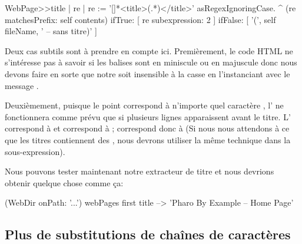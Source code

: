 \documentclass[a4paper,10pt,twoside]{book}
\begin{document}

\begin{code}{}
WebPage>>title
	| re |
	re := '[\w\W]*<title>(.*)</title>' asRegexIgnoringCase.
	^ (re matchesPrefix: self contents)
		ifTrue: [ re subexpression: 2 ]
		ifFalse: [ '(', self fileName, ' -- sans titre)' ]
\end{code} %

Deux cas subtils sont à prendre en compte ici.
Premièrement, le code HTML ne s'intéresse pas à savoir si les balises
sont en miniscule ou en majuscule donc nous devons faire en sorte que
notre \expreg soit insensible à la casse en l'instanciant avec le
message .

Deuxièmement, puisque le point correspond à n'importe quel caractère , l'\expreg 
\mbox{} ne fonctionnera comme prévu que si
plusieurs lignes apparaissent avant le titre.
L'\expreg \ct{\w} correspond à  
et \ct{\W} correspond à ; \ct{[\w\W]} correspond donc à  (Si nous nous
  attendons à ce que les titres contiennent des
  , nous devrons utiliser la même technique
  dans la sous-expression).

Nous pouvons tester maintenant notre extracteur de titre et nous
devrions obtenir quelque chose comme ça:

\begin{code}{}
(WebDir onPath: '...') webPages first title --> 'Pharo By Example -- Home Page'
\end{code}

\subsection{Plus de substitutions de chaînes de caractères}
\end{document}
